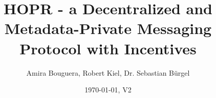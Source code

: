 \documentclass{article}
\title{HOPR - a Decentralized and Metadata-Private Messaging Protocol with Incentives}
\author{Amira Bouguera, Robert Kiel, Dr. Sebastian B\"urgel}
\date{\today, V2}
\begin{document}
\sloppy

\maketitle

\end{document}
